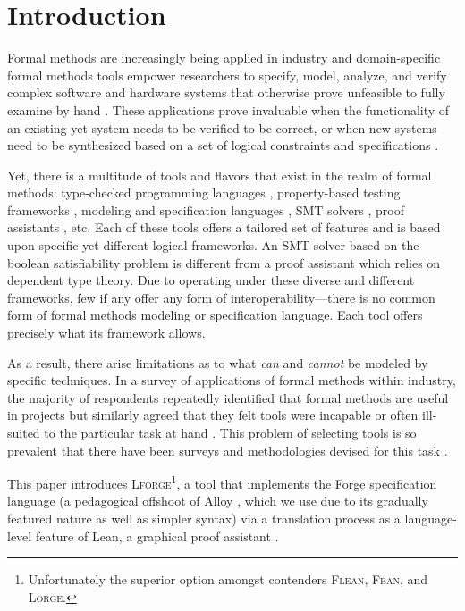 
\section{Introduction}
Formal methods are increasingly being applied in industry and domain-specific formal methods tools empower researchers to specify, model, analyze, and verify complex software and hardware systems that otherwise prove unfeasible to fully examine by hand \cite{abrial2006formal,lecomte2017applying}. These applications prove invaluable when the functionality of an existing yet system needs to be verified to be correct, or when new systems need to be synthesized based on a set of logical constraints and specifications \cite{woodcock2009formal}.

Yet, there is a multitude of tools and flavors that exist in the realm of formal methods: type-checked programming languages \cite{gao2017type,chaudhuri2017fast}, property-based testing frameworks \cite{fink1997property,maciver2019hypothesis}, modeling and specification languages \cite{jackson2012software,jackson2019alloy,ngpdbccdlrrvwwk-oopsla-2024}, SMT solvers \cite{de2008z3}, proof assistants \cite{moura2021lean}, etc. Each of these tools offers a tailored set of features and is based upon specific yet different logical frameworks. An SMT solver based on the boolean satisfiability problem is different from a proof assistant which relies on dependent type theory. Due to operating under these diverse and different frameworks, few if any offer any form of interoperability---there is no common form of formal methods modeling or specification language. Each tool offers precisely what its framework allows. 

As a result, there arise limitations as to what \emph{can} and \emph{cannot} be modeled by specific techniques. In a survey of applications of formal methods within industry, the majority of respondents repeatedly identified that formal methods are useful in projects but similarly agreed that they felt tools were incapable or often ill-suited to the particular task at hand \cite{woodcock2009formal}. This problem of selecting tools is so prevalent that there have been surveys and methodologies devised for this task \cite{kossak2016select,cheng2006survey}. 

This paper introduces \textsc{Lforge}\footnote{Unfortunately the superior option amongst contenders \textsc{Flean}, \textsc{Fean}, and \textsc{Lorge}.}, a tool that implements the Forge specification language \cite{ngpdbccdlrrvwwk-oopsla-2024} (a pedagogical offshoot of Alloy \cite{jackson2012software}, which we use due to its gradually featured nature as well as simpler syntax) via a translation process as a language-level feature of Lean, a graphical proof assistant \cite{moura2021lean}.

